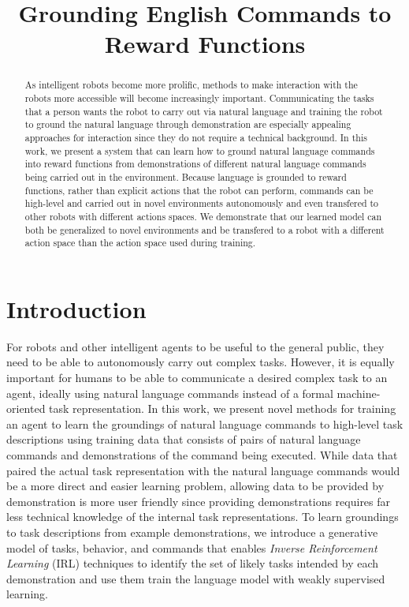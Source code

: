 \documentclass[conference]{IEEEtran}
\title{Grounding English Commands to Reward Functions}
\author{}
\begin{document}
\maketitle

\begin{abstract}
As intelligent robots become more prolific, methods to make interaction with the robots more accessible will become increasingly important. Communicating the tasks that a person wants the robot to carry out via natural language and training the robot to ground the natural language through demonstration are especially appealing approaches for interaction since they do not require a technical background. In this work, we present a system that can learn how to ground natural language commands into reward functions from demonstrations of different natural language commands being carried out in the environment.
Because language is grounded to reward functions, rather than explicit actions that the robot can perform, commands can be high-level and carried out in novel environments autonomously and even transfered to other robots with different actions spaces. We demonstrate that our learned model can both be generalized to novel environments and be transfered to a robot with a different action space than the action space used during training.
\end{abstract}

\IEEEpeerreviewmaketitle

\section{Introduction}
For robots and other intelligent agents to be useful to the general public, they need to be able to autonomously carry out complex tasks. However, it is equally important for humans to be able to communicate a desired complex task to an agent, ideally using natural language commands instead of a formal machine-oriented task representation. In this work, we present novel methods for training an agent to learn the groundings of natural language commands to high-level task descriptions using training data that consists of pairs of natural language commands and demonstrations of the command being executed. While data that paired the actual task representation with the natural language commands would be a more direct and easier learning problem, allowing data to be provided by demonstration is more user friendly since providing demonstrations requires far less technical knowledge of the internal task representations. To learn groundings to task descriptions from example demonstrations, we introduce a generative model of tasks, behavior, and commands that enables {\em Inverse Reinforcement Learning} (IRL) \cite{ng00} techniques to identify the set of likely tasks intended by each demonstration and use them train the language model with weakly supervised learning. 
\end{document}
